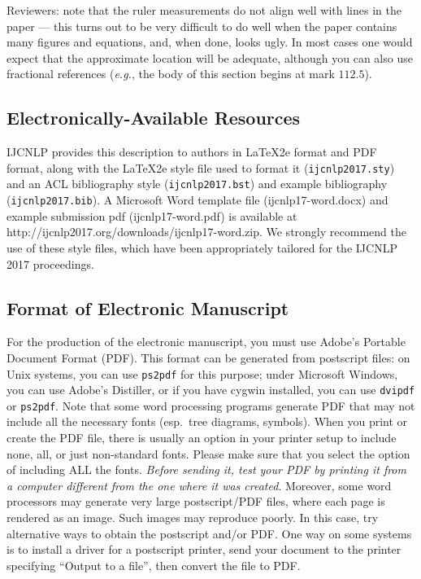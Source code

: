 \documentclass[11pt,letterpaper]{article}
\begin{document}
Reviewers:
note that the ruler measurements do not align well with lines in the paper
--- this turns out to be very difficult to do well when the paper contains
many figures and equations, and, when done, looks ugly.  In most cases one 
would expect that the approximate location will be adequate, although you 
can also use fractional references ({\em e.g.}, the body of this section 
begins at mark $112.5$).

\subsection{Electronically-Available Resources}

IJCNLP provides this description to authors in \LaTeX2e{} format
and PDF format, along with the \LaTeX2e{} style file used to format it
({\small\tt ijcnlp2017.sty}) and an ACL bibliography style
({\small\tt ijcnlp2017.bst}) and example bibliography
({\small\tt ijcnlp2017.bib}). 
A Microsoft Word template file (ijcnlp17-word.docx) and example submission pdf (ijcnlp17-word.pdf) is available at http://ijcnlp2017.org/downloads/ijcnlp17-word.zip.
We strongly recommend the use of these style files, which have been 
appropriately tailored for the IJCNLP 2017 proceedings.

\subsection{Format of Electronic Manuscript}
\label{sect:pdf}

For the production of the electronic manuscript, you must use Adobe's
Portable Document Format (PDF). This format can be generated from
postscript files: on Unix systems, you can use {\small\tt ps2pdf} for this
purpose; under Microsoft Windows, you can use Adobe's Distiller, or
if you have cygwin installed, you can use {\small\tt dvipdf} or
{\small\tt ps2pdf}.  Note 
that some word processing programs generate PDF that may not include
all the necessary fonts (esp.\ tree diagrams, symbols). When you print
or create the PDF file, there is usually an option in your printer
setup to include none, all, or just non-standard fonts.  Please make
sure that you select the option of including ALL the fonts.  {\em Before
sending it, test your {\/\em PDF} by printing it from a computer different
from the one where it was created}. Moreover, some word processors may
generate very large postscript/PDF files, where each page is rendered as
an image. Such images may reproduce poorly.  In this case, try alternative
ways to obtain the postscript and/or PDF.  One way on some systems is to
install a driver for a postscript printer, send your document to the
printer specifying ``Output to a file'', then convert the file to PDF.
\end{document}
